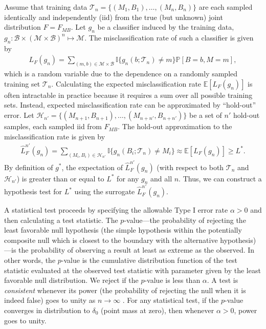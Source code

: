 \documentclass{article}
\newcommand{\conv}{\rightarrow}
\newcommand{\mB}{\mathcal{B}}
\newcommand{\mM}{\mathcal{M}}
\newcommand{\PP}{\mathbb{P}}           %
\newcommand{\EE}{\mathbb{E}}           %
\newcommand{\II}{\mathbb{I}}           %
\providecommand{\mc}[1]{\mathcal{#1}}
\newcommand{\hL}{\widehat{L}}
\begin{document}
Assume that training data $\mc{T}_n=\{(M_{1},B_{1}), \ldots, (M_{n},B_{n})\}$ are each sampled identically and independently (iid) from the true (but unknown) joint distribution $F=F_{MB}$.  Let $g_n$ be a classifier induced by the training data, $g_n:\mB \times (\mc{M} \times \mc{B})^n \mapsto \mM$.  The  misclassification rate of such a classifier is given by
\begin{align}
L_F(g_n)=\sum_{(m,b)  \in \mc{M}\times \mc{B}} \II\{g_n(b; \mc{T}_n) \neq m\} \PP[B=b,M=m],
\end{align}
which is a random variable due to the dependence on a randomly sampled training set $\mc{T}_n$.  
Calculating the expected misclassification rate $\EE[L_F(g_n)]$ is often intractable in practice because it requires a sum over all possible training sets.  Instead, expected misclassification rate can be approximated by ``hold-out'' error.  Let $\mc{H}_{n'}=\{(M_{n+1},B_{n+1}), \ldots, (M_{n+n'},B_{n+n'})\}$ be a set of $n'$ hold-out samples, each sampled iid from $F_{MB}$.  The hold-out approximation to the misclassification rate is given by
\begin{align}
\hL^{n'}_{F}(g_{n}) = \sum_{(M_i,B_i) \in \mc{H}_{n'}}\II \{g_{n}(B_i; \mc{T}_{n})\neq M_i\} \approx \EE[L_F(g_n)] \geq L^*. %
\end{align}
By definition of $g^*$, the expectation of $\hL^{n'}_F(g_n)$ (with respect to both $\mc{T}_n$ and $\mc{H}_{n'}$)  is greater than or equal to $L^*$ for any $g_n$ and all $n$.  Thus, we can construct a hypothesis test for $L^*$ using the surrogate $\hL^{n'}_F(g_n)$.  

A statistical test proceeds by 
specifying the allowable Type I error rate $\alpha>0$ and then
calculating a 
test statistic.
The $p$-value---the probability of rejecting the least favorable null hypothesis (the simple hypothesis within the potentially composite null which is closest to the boundary with the alternative hypothesis)---is the probability of observing a result at least as extreme as the observed.  In other words, the $p$-value is the cumulative distribution function of the test statistic evaluated at the observed test statistic with parameter given by the least favorable null distribution.
We reject if 
the $p$-value 
is less than $\alpha$.   A test is \emph{consistent} whenever its power  (the probability of rejecting the null when it is indeed false)  goes to unity as $n\conv \infty$ . For any statistical test, if the $p$-value converges in distribution to $\delta_0$ (point mass at zero), then whenever $\alpha >0$, power goes to unity. 
\end{document}
